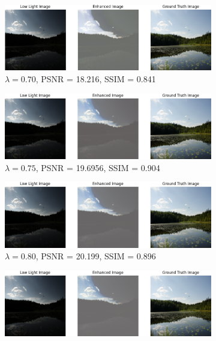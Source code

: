\documentclass[a4paper]{ctexart}
\begin{document}
\begin{figure}[htbp]
\begin{subfigure}{0.45\textwidth}
				\includegraphics[width=\linewidth]{picture/LLIE/Experiment/myplot_skip_stem_lambda_0.70_fpn_ssim_0.8610_psnr_18.4118}
				\caption{$\lambda = 0.70$, PSNR = 18.216, SSIM = 0.841}
				\label{fig: fpn_lambda = 0.70}	
			\end{subfigure}
			\begin{subfigure}{0.45\textwidth}
				\includegraphics[width=\linewidth]{picture/LLIE/Experiment/myplot_skip_stem_lambda_0.75_fpn_ssim_0.9040_psnr_19.6956}
				\caption{$\lambda = 0.75$, PSNR = 19.6956, SSIM = 0.904}
				\label{fig: fpn_lambda = 0.75}	
			\end{subfigure}
			\begin{subfigure}{0.45\textwidth}
				\includegraphics[width=\linewidth]{picture/LLIE/Experiment/myplot_skip_stem_lambda_0.80_fpn_ssim_0.8959_psnr_20.1990}
				\caption{$\lambda = 0.80$, PSNR = 20.199, SSIM = 0.896}
				\label{fig: fpn_lambda = 0.80}	
			\end{subfigure}
			\begin{subfigure}{0.45\textwidth}
				\includegraphics[width=\linewidth]{picture/LLIE/Experiment/myplot_skip_stem_lambda_0.85_fpn_ssim_0.9060_psnr_20.1129}

\end{subfigure}
\end{figure}
\end{document}
